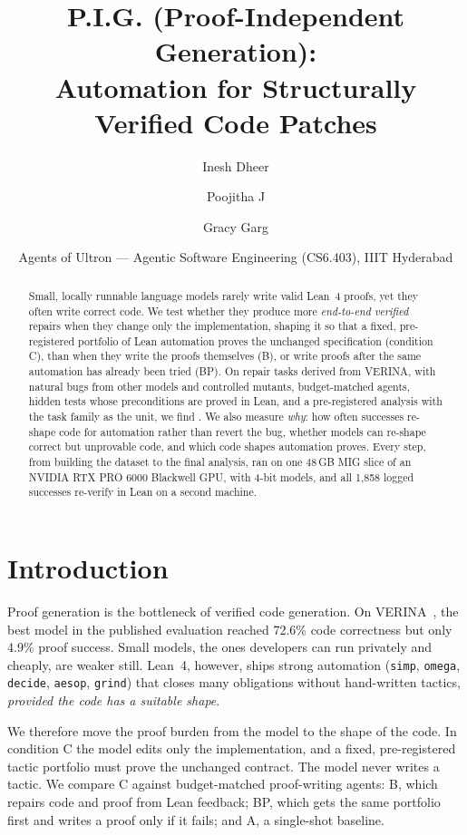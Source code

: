 \documentclass[10pt,twocolumn]{article}
\title{P.I.G. (Proof-Independent Generation):\\Automation for Structurally Verified Code Patches}
\author{Inesh Dheer \and Poojitha J \and Gracy Garg}
\date{\small Agents of Ultron --- Agentic Software Engineering (CS6.403), IIIT Hyderabad}
\begin{document}
\maketitle

\begin{abstract}
Small, locally runnable language models rarely write valid Lean~4 proofs, yet they often write correct code.
We test whether they produce more \emph{end-to-end verified} repairs when they change only the implementation,
shaping it so that a fixed, pre-registered portfolio of Lean automation proves the unchanged specification
(condition C), than when they write the proofs themselves (B), or write proofs after the same automation has
already been tried (BP). On repair tasks derived from VERINA, with natural bugs from other models and
controlled mutants, budget-matched agents, hidden tests whose preconditions are proved in Lean, and a
pre-registered analysis with the task family as the unit, we find \resAbstractFinding.
We also measure \emph{why}: how often successes re-shape code for automation rather than revert the bug,
whether models can re-shape correct but unprovable code, and which code shapes automation proves.
Every step, from building the dataset to the final analysis, ran on one 48\,GB MIG slice of an NVIDIA RTX PRO
6000 Blackwell GPU, with 4-bit models, and all 1,858 logged successes re-verify in Lean on a second machine.
\end{abstract}

\section{Introduction}
Proof generation is the bottleneck of verified code generation. On VERINA~\cite{verina}, the best model in the
published evaluation reached 72.6\% code correctness but only 4.9\% proof success. Small models, the ones
developers can run privately and cheaply, are weaker still. Lean~4, however, ships strong automation
(\texttt{simp}, \texttt{omega}, \texttt{decide}, \texttt{aesop}, \texttt{grind}) that closes many obligations
without hand-written tactics, \emph{provided the code has a suitable shape}.

We therefore move the proof burden from the model to the shape of the code. In condition C the model edits
only the implementation, and a fixed, pre-registered tactic portfolio must prove the unchanged contract. The
model never writes a tactic. We compare C against budget-matched proof-writing agents: B, which repairs code
and proof from Lean feedback; BP, which gets the same portfolio first and writes a proof only if it fails;
and A, a single-shot baseline.
\end{document}
